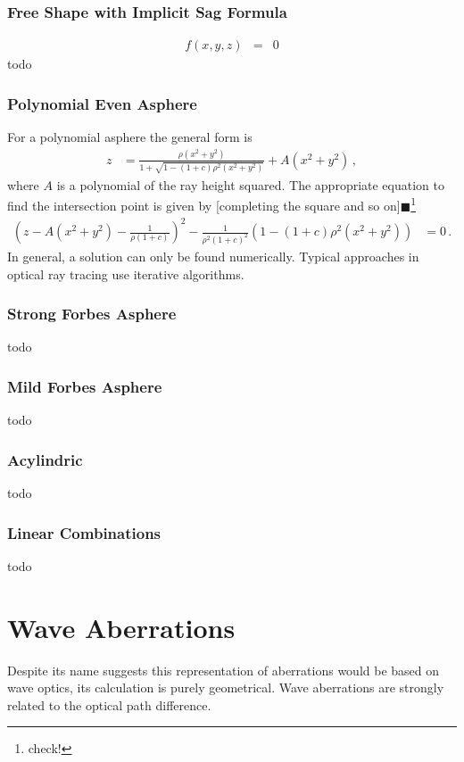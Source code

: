 \documentclass[12pt,a4paper,twoside,openright,BCOR10mm,headsepline,titlepage,abstracton,chapterprefix,final]{scrreprt}
\newcommand{\remark}[1]{{\color{red}$\blacksquare$}\footnote{{\color{red}#1}}}
\begin{document}
\subsection{Free Shape with Implicit Sag Formula}
\begin{eqnarray}
 f(x,y,z) &=& 0
\end{eqnarray}
todo

\subsection{Polynomial Even Asphere}

For a polynomial asphere the general form is
\begin{align}
  z &=  \frac
 { \rho ( x^2 + y^2 ) }
 { 1 + \sqrt{1 - (1+c) \rho^2  (x^2 + y^2)} } + A(x^2 + y^2)\,,
\end{align}
where $A$ is a polynomial of the ray height squared.
The appropriate equation to find the intersection point is given by [completing the square and so on]\remark{check!}
\begin{align}
 \left(z - A(x^2 + y^2) - \frac{1}{\rho(1+c)}\right)^2 - \frac{1}{\rho^2 (1+c)^2} \left(1 -(1+c)\rho^2 (x^2 + y^2) \right) &= 0\,.
\end{align}
In general, a solution can only be found numerically. 
Typical approaches in optical ray tracing use iterative algorithms.

\subsection{Strong Forbes Asphere}
todo
\subsection{Mild Forbes Asphere}
todo
\subsection{Acylindric}
todo


\subsection{Linear Combinations}
todo



\chapter{Wave Aberrations}
Despite its name suggests this representation of aberrations would be based on wave optics, its calculation is purely geometrical.
Wave aberrations are strongly related to the optical path difference.
\end{document}
